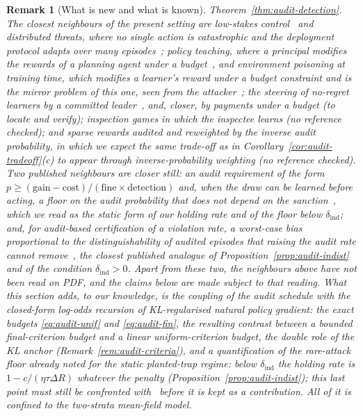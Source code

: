 \documentclass[11pt,a4paper]{article}
\newtheorem{remark}[theorem]{Remark}
\begin{document}
\begin{remark}[What is new and what is known]
Theorem~\ref{thm:audit-detection}. The closest neighbours of the present setting are low-stakes control~\cite{christiano2021lowstakes} and distributed threats, where no single action is catastrophic and the deployment protocol adapts over many episodes~\cite{wen2024adaptive}; policy teaching, where a principal modifies the rewards of a planning agent under a budget~\cite{zhang2008policyteaching}, and environment poisoning at training time, which modifies a learner's reward under a budget constraint and is the mirror problem of this one, seen from the attacker~\cite{rakhsha2020poisoning}; the steering of no-regret learners by a committed leader~\cite{deng2019strategizing}, and, closer, by payments under a budget (to locate and verify); inspection games in which the inspectee learns (no reference checked); and sparse rewards audited and reweighted by the inverse audit probability, in which we expect the same trade-off as in Corollary~\ref{cor:audit-tradeoff}(c) to appear through inverse-probability weighting (no reference checked). Two published neighbours are closer still: an audit requirement of the form $p\ge(\text{gain}-\text{cost})/(\text{fine}\times\text{detection})$ and, when the draw can be learned before acting, a floor on the audit probability that does not depend on the sanction~\cite{gans2026randomized}, which we read as the static form of our holding rate and of the floor below $\delta_{\mathrm{ind}}$; and, for audit-based certification of a violation rate, a worst-case bias proportional to the distinguishability of audited episodes that raising the audit rate cannot remove~\cite{zhu2026blindfold}, the closest published analogue of Proposition~\ref{prop:audit-indist} and of the condition $\delta_{\mathrm{ind}}>0$. Apart from these two, the neighbours above have not been read on PDF, and the claims below are made subject to that reading. What this section adds, to our knowledge, is
the coupling of the audit schedule with the closed-form log-odds recursion of
KL-regularised natural policy gradient: the exact budgets
\eqref{eq:audit-unif} and \eqref{eq:audit-fin}, the resulting contrast between
a bounded final-criterion budget and a linear uniform-criterion budget, the
double role of the KL anchor (Remark~\ref{rem:audit-criteria}), and a quantification of the rare-attack floor already noted for the static planted-trap regime: below $\delta_{\mathrm{ind}}$ the holding rate is $1-c/(\eta\tau\Delta R)$ whatever the penalty (Proposition~\ref{prop:audit-indist}); this last point must still be confronted with~\cite{gans2026randomized,zhu2026blindfold} before it is kept as a contribution. All of it is
confined to the two-strata mean-field model.
\end{remark}
\end{document}
